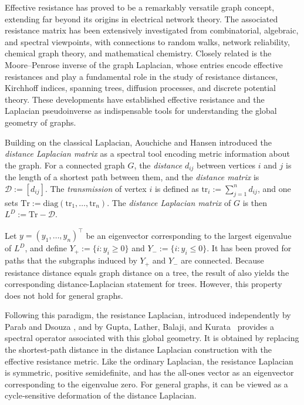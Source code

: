 \documentclass[12pt,a4paper]{amsart}
\theoremstyle{remark}
\theoremstyle{definition}
\newcommand{\1}{\mathbf{1}}
\newcommand{\0}{\mathbf{0}}
\begin{document}
Effective resistance has proved to be a remarkably versatile graph concept, extending far beyond its origins in electrical network theory. 
The associated resistance matrix has been extensively investigated from combinatorial, algebraic, and spectral viewpoints, with connections to random walks, network reliability, chemical graph theory, and mathematical chemistry. 
Closely related is the Moore--Penrose inverse of the graph Laplacian, whose entries encode effective resistances and play a fundamental role in the study of resistance distances, Kirchhoff indices, spanning trees, diffusion processes, and discrete potential theory. These developments have established effective resistance and the Laplacian pseudoinverse as indispensable tools for understanding the global geometry of graphs.

Building on the classical Laplacian, Aouchiche and Hansen \cite{Aouchiche2013} introduced  the \emph{distance Laplacian matrix} as a spectral tool encoding metric information about the graph. 
For a connected graph $G$, the \emph{distance} $d_{ij}$ between 
vertices $i$ and $j$ is the length of a shortest path between them, and the  \emph{distance matrix} is $\mathcal{D} := [d_{ij}]$. 
The \emph{transmission} of vertex $i$ is  defined as $\mathrm{tr}_i := \sum_{j=1}^n d_{ij}$, and one sets $\mathrm{Tr} := \mathrm{diag}(\mathrm{tr}_1, \dots, \mathrm{tr}_n)$. 
The \emph{distance Laplacian matrix} of $G$ is then $L^D := \mathrm{Tr} - \mathcal{D}$.

Let $y = (y_1, \dots, y_n)^\top$ be an eigenvector corresponding to the largest 
eigenvalue of $L^D$, and define $Y_+ := \{i : y_i \geq 0\}$ and 
$Y_- := \{i : y_i \leq 0\}$. It has been proved for paths \cite{nath, bapat2014} that the subgraphs induced by
$Y_+$ and $Y_-$ are connected. Because resistance distance equals
graph distance on a tree, the result of \cite[Theorem~3.1]{gupta} also
yields the corresponding distance-Laplacian statement for trees.
However, this property does not hold for general graphs.


Following this paradigm, the resistance Laplacian, introduced independently by Parab and Dsouza \cite{parab2024}, and by Gupta, Lather, Balaji, and Kurata~\cite{gupta2} provides a spectral operator associated with this global geometry. 
It is obtained by replacing the shortest-path distance in the distance Laplacian construction with the effective resistance metric. Like the ordinary Laplacian, the resistance Laplacian is symmetric, positive semidefinite, and has the all-ones vector as an eigenvector corresponding to the eigenvalue zero. For general graphs, it can be viewed as a cycle‑sensitive deformation of the distance Laplacian.
\end{document}
